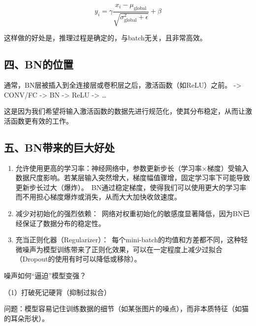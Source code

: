 \[
y_i=\gamma\frac{x_i-\mu_{\text{global}}}{\sqrt{\sigma_{\text{global}}^2+\epsilon}}+\beta
\]

这样做的好处是，推理过程是确定的，与batch无关，且非常高效。

\hypertarget{ux56dbbnux7684ux4f4dux7f6e}{%
\subsection{四、BN的位置}\label{ux56dbbnux7684ux4f4dux7f6e}}

通常，BN层被插入到全连接层或卷积层之后，激活函数（如ReLU）之前。
-\textgreater{} CONV/FC -\textgreater{} BN -\textgreater{} ReLU -\textgreater{} \ldots{}

这是因为我们希望将输入激活函数的数据先进行规范化，使其分布稳定，从而让激活函数更有效的工作。

\hypertarget{ux4e94bnux5e26ux6765ux7684ux5de8ux5927ux597dux5904}{%
\subsection{五、BN带来的巨大好处}\label{ux4e94bnux5e26ux6765ux7684ux5de8ux5927ux597dux5904}}

\begin{enumerate}
\def\labelenumi{\arabic{enumi}.}
\item
  允许使用更高的学习率：神经网络中，参数更新步长（学习率×梯度）受输入数据尺度影响。若某层输入突然增大，梯度幅值骤增，固定学习率下可能导致更新步长过大（爆炸）。~BN通过稳定梯度，使得我们可以使用更大的学习率而不用担心梯度爆炸或消失，从而大大加快收敛速度。
\item
  减少对初始化的强烈依赖：~网络对权重初始化的敏感度显著降低，因为BN已经保证了数据分布的稳定性。
\item
  充当正则化器（Regularizer）：~每个mini-batch的均值和方差都不同，这种轻微噪声为模型训练带来了正则化效果，可以在一定程度上减少过拟合（Dropout的使用有时可以降低或移除）。
\end{enumerate}

噪声如何``逼迫''模型变强？\hspace{0pt}\hspace{0pt}

（1）打破死记硬背（抑制过拟合）\hspace{0pt}\hspace{0pt}

问题：模型容易记住训练数据的细节（如某张图片的噪点），而非本质特征（如猫的耳朵形状）。

